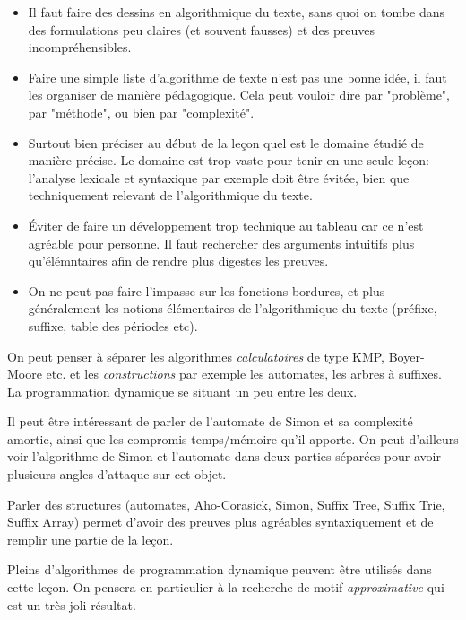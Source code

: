 \documentclass{article}
\begin{document}
\begin{itemize}
    \item Il faut faire des dessins en algorithmique du texte, sans 
        quoi on tombe dans des formulations peu claires (et souvent 
        fausses) et des preuves incompréhensibles.

    \item Faire une simple liste d'algorithme de texte n'est pas 
        une bonne idée, il faut les organiser de manière pédagogique.
        Cela peut vouloir dire par "problème", par "méthode", ou 
        bien par "complexité".

    \item Surtout bien préciser au début de la leçon quel est le 
        domaine étudié de manière précise. Le domaine est trop vaste 
        pour tenir en une seule leçon: l'analyse lexicale et 
        syntaxique par exemple doit être évitée, bien que techniquement
        relevant de l'algorithmique du texte.

    \item Éviter de faire un développement trop technique au tableau 
        car ce n'est agréable pour personne. Il faut rechercher 
        des arguments intuitifs plus qu'élémntaires afin de rendre 
        plus digestes les preuves.

    \item On ne peut pas faire l'impasse sur les fonctions bordures,
        et plus généralement les notions élémentaires de l'algorithmique
        du texte (préfixe, suffixe, table des périodes etc).
\end{itemize}

\secidees

On peut penser à séparer les algorithmes \emph{calculatoires}
de type KMP, Boyer-Moore etc. et les \emph{constructions}
par exemple les automates, les arbres à suffixes. La programmation
dynamique se situant un peu entre les deux.


Il peut être intéressant de parler de l'automate de Simon et 
sa complexité amortie, ainsi que les compromis temps/mémoire
qu'il apporte. On peut d'ailleurs voir l'algorithme de Simon
et l'automate dans deux parties séparées pour avoir plusieurs 
angles d'attaque sur cet objet.

Parler des structures (automates, Aho-Corasick, Simon,
Suffix Tree, Suffix Trie, Suffix Array) permet d'avoir 
des preuves plus agréables syntaxiquement et de remplir 
une partie de la leçon.

Pleins d'algorithmes de programmation dynamique peuvent 
être utilisés dans cette leçon. On pensera en particulier 
à la recherche de motif \emph{approximative} qui est un 
très joli résultat.
\end{document}
